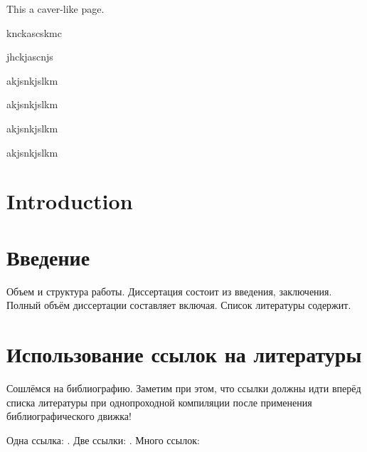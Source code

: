 \documentclass[a4paper, 12pt, oneside, openany]{article}
\begin{document}
    This a caver-like page.
    \lipsum[1-7]

    knckascskmc \par
    jhckjascnjs \par
    akjsnkjslkm \par
    akjsnkjslkm \par
    akjsnkjslkm \par
    akjsnkjslkm \par

    \section{Introduction}
    \lipsum

    \lipsum \lipsum
    \lipsum \lipsum

    \section{Введение}
    Объем и структура работы. Диссертация состоит из введения,
    заключения. Полный объём диссертации составляет включая. 
    Список литературы содержит.
    

    
    
    
    \pagebreak
    \section{Использование ссылок на литературы}
    Сошлёмся на библиографию. Заметим при этом, что ссылки должны идти вперёд списка литературы 
    при однопроходной компиляции после применения библиографического движка!
    

    Одна ссылка:    \cite[с.~54]{Sokolov} \cite[с.~36]{Gaidaenko}.
    Две ссылки:     \cite{Sokolov, Gaidaenko}.
    Много ссылок:   \cite{Lermontov, Management, Borozda, Marketing, Constitution, FamilyCode,
    Gost.7.0.53, Razumovski, Lagkueva, Pokrovski, Methodology, Berestova, Kriger}
    
    \insertBiblio
\end{document}
